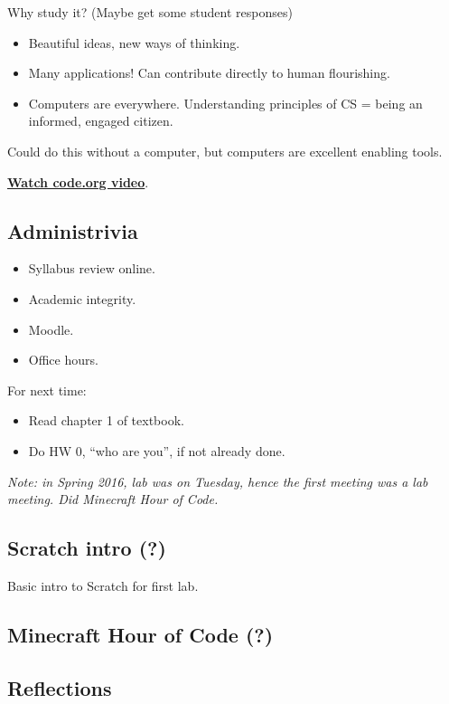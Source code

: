 \documentclass{article}
\begin{document}
Why study it?  (Maybe get some student responses)
\begin{itemize}
\item Beautiful ideas, new ways of thinking.
\item Many applications!  Can contribute directly to human flourishing.
\item Computers are everywhere.  Understanding principles of CS =
  being an informed, engaged citizen.
\end{itemize}
Could do this without a computer, but computers are excellent enabling
tools.

\href{https://www.youtube.com/watch?v=qYZF6oIZtfc}{\textbf{Watch code.org video}}.

\subsection*{Administrivia}

\begin{itemize}
\item Syllabus review online.
\item Academic integrity.
\item Moodle.
\item Office hours.
\end{itemize}

For next time:

\begin{itemize}
\item Read chapter 1 of textbook.
\item Do HW 0, ``who are you'', if not already done.
\end{itemize}

\emph{Note: in Spring 2016, lab was on Tuesday, hence the first
  meeting was a lab meeting.  Did Minecraft Hour of Code.}

\subsection*{Scratch intro (?)}

Basic intro to Scratch for first lab.

\subsection*{Minecraft Hour of Code (?)}

\subsection*{Reflections}
\end{document}
